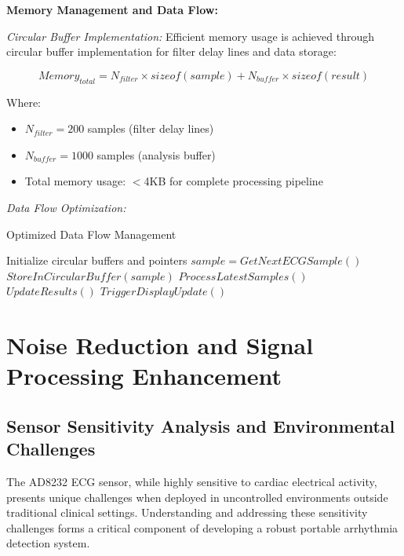 \documentclass[12pt,a4paper]{article}
\begin{document}
\vspace{0.5cm}

\textbf{Memory Management and Data Flow:}

\textit{Circular Buffer Implementation:}
Efficient memory usage is achieved through circular buffer implementation for filter delay lines and data storage:

\begin{equation*}
Memory_{total} = N_{filter} \times sizeof(sample) + N_{buffer} \times sizeof(result)
\end{equation*}

Where:
\begin{itemize}
\item $N_{filter} = 200$ samples (filter delay lines)
\item $N_{buffer} = 1000$ samples (analysis buffer)
\item Total memory usage: $<$4KB for complete processing pipeline
\end{itemize}

\newpage

\textit{Data Flow Optimization:}
\begin{algorithm}
\caption{Optimized Data Flow Management}
\begin{algorithmic}
\STATE Initialize circular buffers and pointers
    \STATE $sample = GetNextECGSample()$
    \STATE $StoreInCircularBuffer(sample)$
    \STATE $ProcessLatestSamples()$
        \STATE $UpdateResults()$
        \STATE $TriggerDisplayUpdate()$
    \ENDIF
\ENDWHILE
\end{algorithmic}
\end{algorithm}

\section{Noise Reduction and Signal Processing Enhancement}

\subsection{Sensor Sensitivity Analysis and Environmental Challenges}

The AD8232 ECG sensor, while highly sensitive to cardiac electrical activity, presents unique challenges when deployed in uncontrolled environments outside traditional clinical settings. Understanding and addressing these sensitivity challenges forms a critical component of developing a robust portable arrhythmia detection system.
\end{document}

